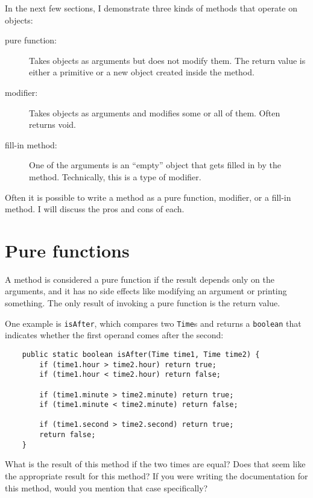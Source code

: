 \documentclass[12pt]{book}
\theoremstyle{definition}
\begin{document}
In the next few
sections, I demonstrate three kinds of methods that
operate on objects:

\begin{description}

\item[pure function:]  Takes objects as
arguments but does not modify them.  The return value is
either a primitive or a new object created inside the method.

\item[modifier:]  Takes objects as arguments and modifies some
or all of them.  Often returns void. 

\item[fill-in method:]  One of the arguments is an ``empty''
object that gets filled in by the method.  Technically, this is
a type of modifier.

\end{description}

Often it is possible to write a method as a pure function, modifier,
or a fill-in method.  I will discuss the pros and cons of each.


\section{Pure functions}

A method is considered a pure function if the result depends only on
the arguments, and it has no side effects like modifying an argument
or printing something.  The only result of invoking a pure function is
the return value.

One example is {\tt isAfter}, which compares two {\tt Time}s and
returns a {\tt boolean} that indicates whether the first operand
comes after the second:

\begin{lstlisting}
    public static boolean isAfter(Time time1, Time time2) {
        if (time1.hour > time2.hour) return true;
        if (time1.hour < time2.hour) return false;

        if (time1.minute > time2.minute) return true;
        if (time1.minute < time2.minute) return false;

        if (time1.second > time2.second) return true;
        return false;
    }
\end{lstlisting}
%
What is the result of this method if the two times are equal?  Does
that seem like the appropriate result for this method?  If you were
writing the documentation for this method, would you mention that case
specifically?
\end{document}
